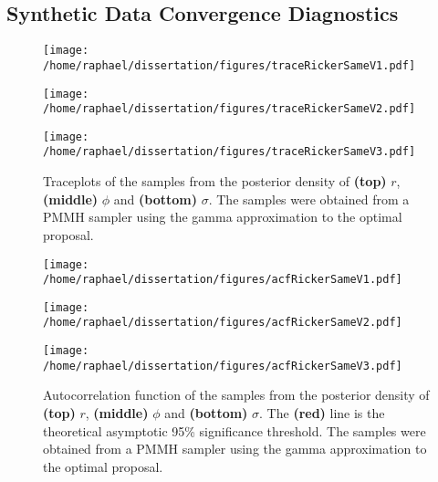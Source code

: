 \documentclass[12pt]{article}
\begin{document}
\begin{appendices}
	\subsection{Synthetic Data Convergence Diagnostics}
\clearpage
\thispagestyle{empty}
	\begin{figure}[htb]
		\centering
		\begin{minipage}{0.6\textwidth}
			\centering
			\texttt{[image: /home/raphael/dissertation/figures/traceRickerSameV1.pdf]}
		\end{minipage}
		\begin{minipage}{0.6\textwidth}
			\centering
			\texttt{[image: /home/raphael/dissertation/figures/traceRickerSameV2.pdf]}
		\end{minipage}
		\begin{minipage}{0.6\textwidth}
			\centering
			\texttt{[image: /home/raphael/dissertation/figures/traceRickerSameV3.pdf]}
		\end{minipage}
		\caption[Traceplots of a run of a PMMH sampler on data simulated from the Ricker model]{Traceplots of the samples from the posterior density of \textbf{(top)} $r$, \textbf{(middle)} $\phi$ and \textbf{(bottom)} $\sigma$. The samples were obtained from a PMMH sampler using the gamma approximation to the optimal proposal.}
		\label{fig:traceplotDiag}
	\end{figure}
\clearpage
\thispagestyle{empty}
	\begin{figure}[htb]
		\centering
		\begin{minipage}{0.6\textwidth}
			\centering
			\texttt{[image: /home/raphael/dissertation/figures/acfRickerSameV1.pdf]}
		\end{minipage}
		\begin{minipage}{0.6\textwidth}
			\centering
			\texttt{[image: /home/raphael/dissertation/figures/acfRickerSameV2.pdf]}
		\end{minipage}
		\begin{minipage}{0.6\textwidth}
			\centering
			\texttt{[image: /home/raphael/dissertation/figures/acfRickerSameV3.pdf]}
		\end{minipage}
		\caption[Autocorrelations functions of a run of a PMMH sampler on data simulated from the Ricker model]{Autocorrelation function of the samples from the posterior density of \textbf{(top)} $r$, \textbf{(middle)} $\phi$ and \textbf{(bottom)} $\sigma$. The \textbf{(red)} line is the theoretical asymptotic 95\% significance threshold. The samples were obtained from a PMMH sampler using the gamma approximation to the optimal proposal.}
		\label{fig:acfDiag}
	\end{figure}


\end{appendices}
\end{document}
